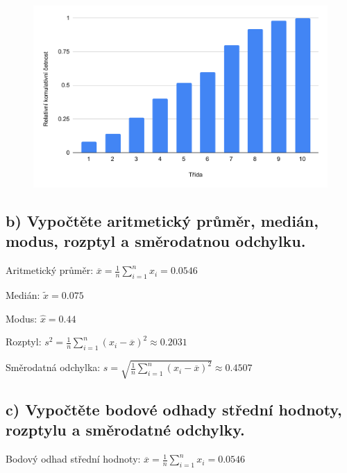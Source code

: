 \documentclass[11pt, a4paper, titlepage]{article}
\begin{document}
\begin{figure}[H]
    \centering
    \includegraphics[width=.75\linewidth]{images/1-a-3.pdf}
\end{figure}

\newpage


\subsection*{b) Vypočtěte aritmetický průměr, medián, modus, rozptyl a směrodatnou odchylku.}

Aritmetický průměr: ${\displaystyle \overline{x} = {\frac {1}{n}} \sum_{i=1}^{n} x_{i} = 0.0546}$
\smallskip

Medián: ${\displaystyle \tilde{x} = 0.075}$
\bigskip

Modus: ${\displaystyle \hat{x} = 0.44}$
\bigskip

Rozptyl: ${\displaystyle s^2 = {\frac {1}{n}} \sum_{i=1}^{n}(x_i - \overline{x})^2} \approx 0.2031$
\smallskip

Směrodatná odchylka: ${\displaystyle s = \sqrt{{\frac {1}{n}} \sum_{i=1}^{n}(x_i - \overline{x})^2}} \approx 0.4507$
\bigskip

\noindent\makebox[\linewidth]{\rule{\paperwidth}{0.3pt}}


\subsection*{c) Vypočtěte bodové odhady střední hodnoty, rozptylu a směrodatné odchylky.}

Bodový odhad střední hodnoty: ${\displaystyle \overline{x} = {\frac {1}{n}} \sum_{i=1}^{n} x_{i} = 0.0546}$
\bigskip
\end{document}
